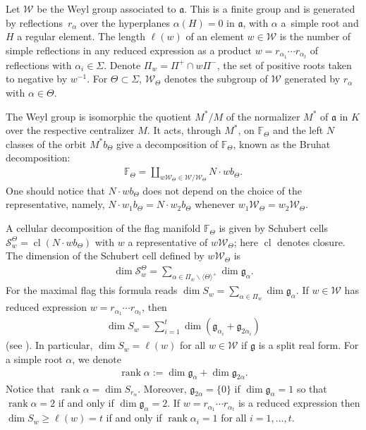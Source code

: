 \documentclass[pdftex]{sigma}
\numberwithin{equation}{section}
\newcommand{\mgg}{\mathfrak g }
\begin{document}
Let $\mathcal{W}$ be the Weyl group associated to $\mathfrak{a}$. This is a finite group and is generated by reflec\-tions~$r_{\alpha }$ over the hyperplanes $\alpha (H) =0$ in $\mathfrak{a}$, with $\alpha $ a~simple root and $H$ a regular element. The length $\ell (w)$ of an element $w\in \mathcal{W}$ is the number of simple reflections in any reduced expression as a product $w=r_{\alpha _{1}}\cdots r_{\alpha _{t}}$ of reflections with $\alpha _{i}\in \Sigma $. Denote $\Pi _{w}=\Pi ^{+}\cap w\Pi ^{-}$, the set of positive roots taken to negative by $w^{-1}$. For $\Theta \subset \Sigma $, $\mathcal{W}_{\Theta }$ denotes the subgroup of $\mathcal{W}$ generated by $r_{\alpha} $ with $\alpha \in \Theta $.

The Weyl group is isomorphic the quotient $M^*/M$ of the normalizer $M^*$ of $\mathfrak{a }$ in $K$ over the respective centralizer $M$. It acts, through $M^*$, on $\mathbb{F}_\Theta$ and the left $N$ classes of the orbit $M^* b_\Theta$ give a decomposition of $\mathbb{F}_\Theta$, known as the Bruhat decomposition:
\begin{gather*}
\mathbb{F}_\Theta=\coprod_{w\mathcal{W}_\Theta \in \mathcal{W}/\mathcal{W}_\Theta}N\cdot w b_\Theta.
\end{gather*}
One should notice that $N\cdot w b_\Theta$ does not depend on the choice of the representative, namely, $N\cdot w_1 b_\Theta=N\cdot w_2 b_\Theta$ whenever $w_1\mathcal{W}_\Theta =w_2\mathcal{W}_\Theta$.

A cellular decomposition of the flag manifold $\mathbb{F}_\Theta$ is given by Schubert cells ${\mathcal{S}}_w^\Theta=\operatorname{cl}(N\cdot wb_\Theta)$ with $w$ a representative of $w\mathcal{W}_\Theta$; here $\operatorname{cl}$ denotes closure. The dimension of the Schubert cell defined by $w\mathcal{W}_\Theta$ is
\begin{gather*}
\dim {\mathcal{S}}_w^\Theta =\sum_{\alpha\in \Pi_w\backslash \langle \Theta \rangle^+}\dim \mathfrak{g }_\alpha.
\end{gather*}
For the maximal flag this formula reads $\dim S_w=\sum\limits_{\alpha\in \Pi_w}\dim \mathfrak{g }_\alpha$. If $w\in \mathcal{W}$ has reduced expression $w=r_{\alpha _{1}}\cdots r_{\alpha _{t}}$, then
\begin{gather}
\dim S_{w}=\sum_{i=1}^{t}\dim (\mathfrak{g}_{\alpha _{i}}+\mathfrak{g}_{2\alpha _{i}}) \label{eq.dimSw}
\end{gather}
(see \cite[Corollary 2.6]{Wi}). In particular, $\dim S_w=\ell(w)$ for all $w\in \mathcal{W}$ if $\mgg$ is a split real form. For a simple root $\alpha $, we denote
\begin{gather*}
\operatorname{rank}\alpha :=\dim \mathfrak{g}_{\alpha }+\dim \mathfrak{g}_{2\alpha }.
\end{gather*}
Notice that $\operatorname{rank} \alpha=\dim S_{r_{\alpha }}$. Moreover, $\mathfrak{g}_{2\alpha }=\{0\}$ if $\dim \mathfrak{g}_{\alpha }=1$ so that $\operatorname{rank}\alpha =2$ if and only if $\dim \mathfrak{g}_{\alpha }=2$. If $w=r_{\alpha _{1}}\cdots r_{\alpha _{t}}$ is a reduced expression then $\dim S_{w}\geq \ell (w)=t$ if and only if $\operatorname{rank}\alpha_{i}=1$ for all $i=1,\dots,t$.
\end{document}
